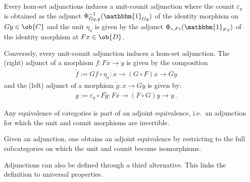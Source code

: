     \begin{property}[Equivalence]
        Every hom-set adjunctions induces a unit-counit adjunction where the counit $\varepsilon_y$ is obtained as the adjunct $\Phi^{-1}_{Gy,y}(\mathbbm{1}_{Gy})$ of the identity morphism on $Gy\in\ob{C}$ and the unit $\eta_x$ is given by the adjunct $\Phi_{c,Fc}(\mathbbm{1}_{Fx})$ of the identity morphism at $Fx\in\ob{D}$.

        Conversely, every unit-counit adjunction induces a hom-set adjunction. The (right) adjunct of a morphism $f:Fx\rightarrow y$ is given by the composition
        \begin{gather}
            \widetilde{f}:=Gf\circ\eta_x:x\rightarrow (G\circ F)x\rightarrow Gy
        \end{gather}
        and the (left) adjunct of a morphism $\widetilde{g}:x\rightarrow Gy$ is given by:
        \begin{gather}
            g:=\varepsilon_y\circ F\tilde{g}:Fx\rightarrow(F\circ G)y\rightarrow y\,.
        \end{gather}
    \end{property}


    \begin{property}
        Any equivalence of categories is part of an adjoint equivalence, i.e.~an adjunction for which the unit and counit morphisms are invertible.
    \end{property}
    \begin{property}\label{cat:adjoint_equivalence}
        Given an adjunction, one obtains an adjoint equivalence by restricting to the full subcategories on which the unit and counit become isomorphisms.
    \end{property}

    Adjunctions can also be defined through a third alternative. This links the definition to universal properties.

